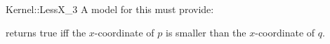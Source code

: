 \begin{ccRefFunctionObjectConcept}{Kernel::LessX_3}
A model for this must provide:


{returns true iff the $x$-coordinate of $p$ is smaller than the
$x$-coordinate of $q$.}

\ccSeeAlso
{}\\

\end{ccRefFunctionObjectConcept}
